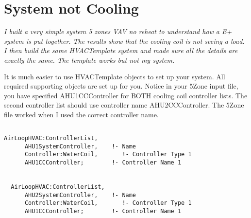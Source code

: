 \section{System not Cooling}\label{system-not-cooling}

\emph{I built a very simple system 5 zones VAV no reheat to understand how a E+ system is put together. The results show that the cooling coil is not seeing a load. I then build the same HVACTemplate system and made sure all the details are exactly the same. The template works but not my system.}

It is much easier to use HVACTemplate objects to set up your system. All required supporting objects are set up for you. Notice in your 5Zone input file, you have specified AHU1CCController for BOTH cooling coil controller lists. The second controller list should use controller name AHU2CCController. The 5Zone file worked when I used the correct controller name.

\begin{lstlisting}

AirLoopHVAC:ControllerList,
      AHU1SystemController,    !- Name
      Controller:WaterCoil,       !- Controller Type 1
      AHU1CCController;        !- Controller Name 1


  AirLoopHVAC:ControllerList,
      AHU2SystemController,    !- Name
      Controller:WaterCoil,       !- Controller Type 1
      AHU1CCController;        !- Controller Name 1
\end{lstlisting}
